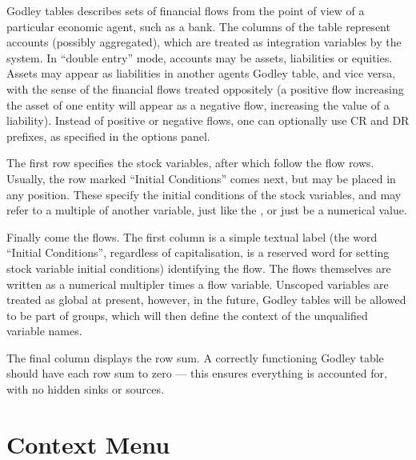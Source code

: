 Godley tables describes sets of financial flows from the point of view
of a particular economic agent, such as a bank. The columns of the
table represent accounts (possibly aggregated), which are treated as
integration variables by the system. In ``double entry'' mode,
accounts may be assets, liabilities or equities. Assets may appear as
liabilities in another agents Godley table, and vice versa, with the
sense of the financial flows treated oppositely (a positive flow increasing the
asset of one entity will appear as a negative flow, increasing the
value of a liability). Instead of positive or negative flows, one can
optionally use CR and DR prefixes, as specified in the options panel.

The first row specifies the stock variables, after which follow the
flow rows. Usually, the row marked ``Initial Conditions'' comes next,
but may be placed in any position. These specify the initial
conditions of the stock variables, and may refer to a multiple of
another variable, just like the , or just be a numerical value.

Finally come the flows. The first column is a simple textual label
(the word ``Initial Conditions'', regardless of capitalisation, is a
reserved word for setting stock variable initial conditions)
identifying the flow. The flows themselves are written as a numerical
multipler times a flow variable. Unscoped variables are treated as
global at present, however, in the future, Godley tables will be
allowed to be part of groups, which will then define the context of
the unqualified variable names.

The final column displays the row sum. A correctly functioning Godley
table should have each row sum to zero --- this ensures everything is
accounted for, with no hidden sinks or sources.

\section{Context Menu}

